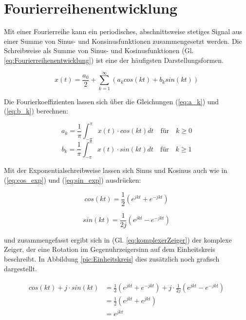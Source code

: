 \section{Fourierreihenentwicklung}
Mit einer Fourierreihe kann ein periodisches, abschnittsweise stetiges Signal aus einer Summe von Sinus- und Konsinusfunktionen
zusammengesetzt werden. Die Schreibweise als Summe von Sinus- und Kosinusfunktionen (Gl. \ref{eq:Fourierreihenentwicklung}) ist eine 
der häufigsten Darstellungsformen.

\begin{equation}\label{eq:Fourierreihenentwicklung}
 x(t) = \frac{a_0}{2} + \sum_{k=1}^\infty \left(a_k cos(kt) + b_k sin(kt)\right)
\end{equation}

Die Fourierkoeffizienten lassen sich über die Gleichungen (\ref{eq:a_k}) und (\ref{eq:b_k}) berechnen:

\begin{equation}\label{eq:a_k}
 a_k = \frac{1}{\pi} \int_{-\pi}^{\pi} x(t) \cdot cos(kt) dt \quad \textrm{für} \quad k \geq 0 
\end{equation}
\begin{equation}\label{eq:b_k}
 b_k = \frac{1}{\pi} \int_{-\pi}^{\pi} x(t) \cdot sin(kt) dt \quad \textrm{für} \quad k \geq 1
\end{equation}

Mit der Exponentialschreibweise lassen sich Sinus und Kosinus auch wie in (\ref{eq:cos_exp}) und (\ref{eq:sin_exp}) ausdrücken:

\begin{equation}\label{eq:cos_exp}
 cos(k t) = \frac{1}{2}\left(e^{j k t} + e^{-j k t} \right)
\end{equation}

\begin{equation}\label{eq:sin_exp}
 sin(k t) = \frac{1}{2j}\left(e^{j k t} - e^{-j k t} \right)
\end{equation}

und zusammengefasst ergibt sich in (Gl. \ref{eq:komplexerZeiger}) der komplexe Zeiger, der eine Rotation im Gegenuhrzeigersinn auf dem Einheitskreis beschreibt.
In Abbildung \ref{pic:Einheitskreis} dies zusätzlich noch grafisch dargestellt.

 \begin{align}
\begin{split}\label{eq:komplexerZeiger}
cos(k t) +j\cdot sin(k t) &= \frac{1}{2}\left(e^{j k t} + e^{-j k t} \right)+j\cdot \frac{1}{2j}\left(e^{j k t} - e^{-j k t} \right)\\
&= \frac{1}{2} \left(e^{j k t} + e^{j k t}\right)\\
&= e^{j k t}\\
\end{split}
\end{align}


